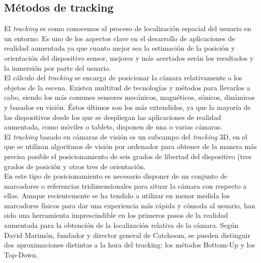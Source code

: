 \subsection{Métodos de tracking}
El \textit{tracking} es como conocemos al proceso de localización espacial del usuario en un entorno. Es uno de los aspectos clave en el desarrollo de aplicaciones de realidad aumentada ya que cuanto mejor sea la estimación de la posición y orientación del dispositivo sensor, mejores y más acertados serán los resultados y la inmersión por parte del usuario.\cite{BostanciTrackingMethods}\\

El cálculo del \textit{tracking} se encarga de posicionar la cámara relativamente a los objetos de la escena. Existen multitud de tecnologías y métodos para llevarlos a cabo, siendo los más comunes sensores mecánicos, magnéticos, sónicos, dinámicos y basados en visión. Éstos últimos son los más extendidos, ya que la mayoría de los dispositivos desde los que se despliegan las aplicaciones de realidad aumentada, como móviles o tablets, disponen de una o varias cámaras. \cite{ARToolkit}\\

El \textit{tracking} basado en cámaras de visión es un subcampo del \textit{tracking} 3D, en el que se utilizan algoritmos de visión por ordenador para obtener de la manera más precisa posible el posicionamiento de seis grados de libertad del dispositivo (tres grados de posición y otros tres de orientación.\\

En este tipo de posicionamiento es necesario disponer de un conjunto de marcadores o referencias tridimensionales para situar la cámara con respecto a ellas. Aunque recientemente se ha tendido a utilizar en menor medida los marcadores físicos para dar una experiencia más rápida y cómoda al usuario, han sido una herramienta imprescindible en los primeros pasos de la realidad aumentada para la obtención de la localización relativa de la cámara.
Según David Marimón\cite{TrackingThesis}, fundador y director general de Catchoom, se pueden distinguir dos aproximaciones distintas a la hora del tracking: los métodos Bottom-Up y los Top-Down. 

